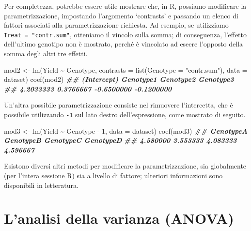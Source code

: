 \documentclass[
  12pt,
]{book}
\newenvironment{Shaded}{\begin{snugshade}}{\end{snugshade}}
\newcommand{\AttributeTok}[1]{\textcolor[rgb]{0.77,0.63,0.00}{#1}}
\newcommand{\DecValTok}[1]{\textcolor[rgb]{0.00,0.00,0.81}{#1}}
\newcommand{\DocumentationTok}[1]{\textcolor[rgb]{0.56,0.35,0.01}{\textbf{\textit{#1}}}}
\newcommand{\FunctionTok}[1]{\textcolor[rgb]{0.00,0.00,0.00}{#1}}
\newcommand{\NormalTok}[1]{#1}
\newcommand{\OtherTok}[1]{\textcolor[rgb]{0.56,0.35,0.01}{#1}}
\newcommand{\SpecialCharTok}[1]{\textcolor[rgb]{0.00,0.00,0.00}{#1}}
\newcommand{\StringTok}[1]{\textcolor[rgb]{0.31,0.60,0.02}{#1}}
\begin{document}
Per completezza, potrebbe essere utile mostrare che, in R, possiamo modificare la parametrizzazione, impostando l'argomento `contrasts' e passando un elenco di fattori associati alla parametrizzazione richiesta. Ad esempio, se utilizziamo \texttt{Treat\ =\ "contr.sum"}, otteniamo il vincolo sulla somma; di conseguenza, l'effetto dell'ultimo genotipo non è mostrato, perché è vincolato ad eseere l'opposto della somma degli altri tre effetti.

\vspace{12pt}

\begin{Shaded}
\begin{Highlighting}[]
\NormalTok{mod2 }\OtherTok{\textless{}{-}} \FunctionTok{lm}\NormalTok{(Yield }\SpecialCharTok{\textasciitilde{}}\NormalTok{ Genotype,}
           \AttributeTok{contrasts =} \FunctionTok{list}\NormalTok{(}\AttributeTok{Genotype =} \StringTok{"contr.sum"}\NormalTok{),}
           \AttributeTok{data =}\NormalTok{ dataset)}
\FunctionTok{coef}\NormalTok{(mod2)}
\DocumentationTok{\#\# (Intercept)   Genotype1   Genotype2   Genotype3 }
\DocumentationTok{\#\#   4.2033333   0.3766667  {-}0.6500000  {-}0.1200000}
\end{Highlighting}
\end{Shaded}

Un'altra possibile parametrizzazione consiste nel rimuovere l'intercetta, che è possibile utilizzando \texttt{-1} sul lato destro dell'espressione, come mostrato di seguito.

\vspace{12pt}

\begin{Shaded}
\begin{Highlighting}[]
\NormalTok{mod3 }\OtherTok{\textless{}{-}} \FunctionTok{lm}\NormalTok{(Yield }\SpecialCharTok{\textasciitilde{}}\NormalTok{ Genotype }\SpecialCharTok{{-}} \DecValTok{1}\NormalTok{, }\AttributeTok{data =}\NormalTok{ dataset)}
\FunctionTok{coef}\NormalTok{(mod3)}
\DocumentationTok{\#\# GenotypeA GenotypeB GenotypeC GenotypeD }
\DocumentationTok{\#\#  4.580000  3.553333  4.083333  4.596667}
\end{Highlighting}
\end{Shaded}

Esistono diversi altri metodi per modificare la parametrizzazione, sia globalmente (per l'intera sessione R) sia a livello di fattore; ulteriori informazioni sono disponibili in letteratura.

\hypertarget{lanalisi-della-varianza-anova}{%
\section{L'analisi della varianza (ANOVA)}\label{lanalisi-della-varianza-anova}}
\end{document}

